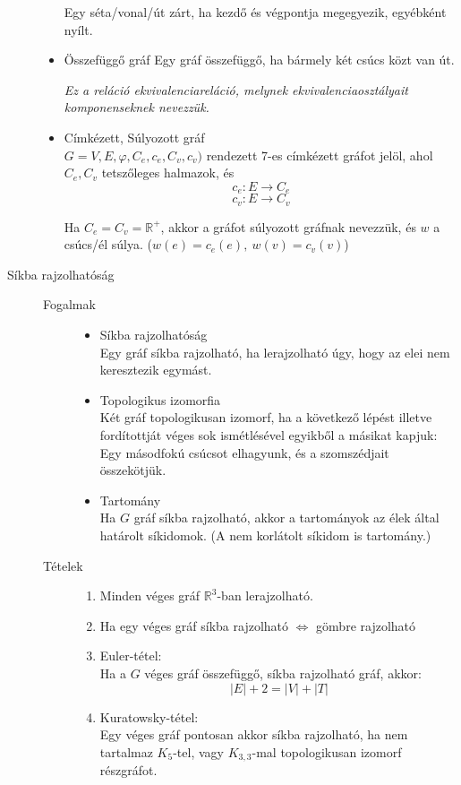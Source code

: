\documentclass[margin=0px]{article}
\newcommand{\R}{\mathbb{R}}
\begin{document}
\begin{description}
\begin{itemize}
							Egy séta/vonal/út zárt, ha kezdő és végpontja megegyezik, egyébként nyílt.
						\item Összefüggő gráf
							Egy gráf összefüggő, ha bármely két csúcs közt van út.
							
							\textit{Ez a reláció ekvivalenciareláció, melynek ekvivalenciaosztályait komponenseknek nevezzük.}
						\item Címkézett, Súlyozott gráf \\
							$G=V,E,\varphi, C_e, c_e, C_v,c_v)$ rendezett 7-es címkézett gráfot jelöl, ahol $C_e, C_v$ tetszőleges halmazok, és
							\[c_e:E\rightarrow C_e\]
							\[c_v:E\rightarrow C_v\]
							
							Ha $C_e = C_v = \R^+$, akkor a gráfot súlyozott gráfnak nevezzük, és $w$ a csúcs/él súlya. (${w(e)=c_e(e)},\ {w(v) = c_v(v)}$)
					\end{itemize}
				\item[Síkba rajzolhatóság] \hfill
					\begin{description}
						\item[Fogalmak] \hfill
							\begin{itemize}
								\item Síkba rajzolhatóság \\
									Egy gráf síkba rajzolható, ha lerajzolható úgy, hogy az elei nem keresztezik egymást.
								\item Topologikus izomorfia \\
									Két gráf topologikusan izomorf, ha a következő lépést illetve fordítottját véges sok ismétlésével egyikből a másikat kapjuk: Egy másodfokú csúcsot elhagyunk, és a szomszédjait összekötjük.
								\item Tartomány \\
									Ha $G$ gráf síkba rajzolható, akkor a tartományok az élek által határolt síkidomok. (A nem korlátolt síkidom is tartomány.)
							\end{itemize}
						\item[Tételek] \hfill
							\begin{enumerate}
								\item Minden véges gráf $\R^3$-ban lerajzolható.
								\item Ha egy véges gráf síkba rajzolható $\Longleftrightarrow$ gömbre rajzolható
								\item Euler-tétel: \\
									Ha a $G$ véges gráf összefüggő, síkba rajzolható gráf, akkor:
									\[|E|+2 = |V|+|T|\]
								\item Kuratowsky-tétel: \\
									Egy véges gráf pontosan akkor síkba rajzolható, ha nem tartalmaz $K_5$-tel, vagy $K_{3,3}$-mal topologikusan izomorf részgráfot.
							\end{enumerate}
					\end{description}
			\end{description}
\end{document}
